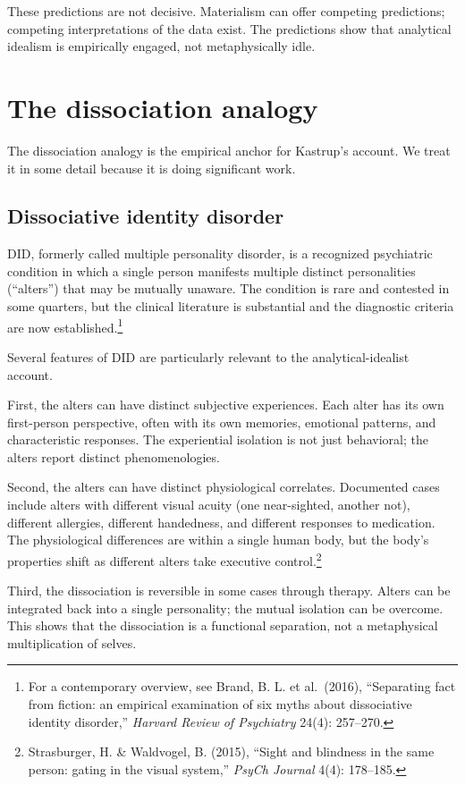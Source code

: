 These predictions are not decisive. Materialism can offer competing
predictions; competing interpretations of the data exist. The
predictions show that analytical idealism is empirically engaged,
not metaphysically idle.

\section{The dissociation analogy}
\label{sec:dissociation}

The dissociation analogy is the empirical anchor for Kastrup's
account. We treat it in some detail because it is doing significant
work.

\subsection{Dissociative identity disorder}

DID, formerly called multiple personality disorder, is a recognized
psychiatric condition in which a single person manifests multiple
distinct personalities (``alters'') that may be mutually unaware. The
condition is rare and contested in some quarters, but the clinical
literature is substantial and the diagnostic criteria are now
established.\footnote{For a contemporary overview, see Brand, B. L.
et al.\ (2016), ``Separating fact from fiction: an empirical
examination of six myths about dissociative identity disorder,''
\emph{Harvard Review of Psychiatry} 24(4): 257--270.}

Several features of DID are particularly relevant to the
analytical-idealist account.

First, the alters can have distinct subjective experiences. Each
alter has its own first-person perspective, often with its own
memories, emotional patterns, and characteristic responses. The
experiential isolation is not just behavioral; the alters report
distinct phenomenologies.

Second, the alters can have distinct physiological correlates.
Documented cases include alters with different visual acuity (one
near-sighted, another not), different allergies, different
handedness, and different responses to medication. The
physiological differences are within a single human body, but the
body's properties shift as different alters take executive
control.\footnote{Strasburger, H. \& Waldvogel, B. (2015),
``Sight and blindness in the same person: gating in the visual
system,'' \emph{PsyCh Journal} 4(4): 178--185.}

Third, the dissociation is reversible in some cases through
therapy. Alters can be integrated back into a single personality;
the mutual isolation can be overcome. This shows that the
dissociation is a functional separation, not a metaphysical
multiplication of selves.

